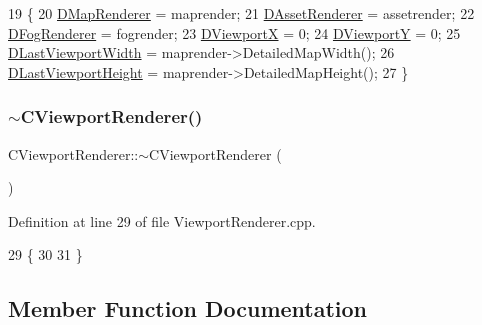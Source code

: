 \begin{DoxyCode}
19                                                                                                            
                                                            \{
20     \hyperlink{classCViewportRenderer_ac6bc7771bd6dcd35107d25bebb0c0a4c}{DMapRenderer} = maprender;
21     \hyperlink{classCViewportRenderer_a3daa075c87bbdde4d1ada41f0b98f4a8}{DAssetRenderer} = assetrender;
22     \hyperlink{classCViewportRenderer_a2fa9d183d00bdba4a2fea6d946992608}{DFogRenderer} = fogrender;
23     \hyperlink{classCViewportRenderer_aea9e05347f71a8e6b83439aab653be18}{DViewportX} = 0;
24     \hyperlink{classCViewportRenderer_ae13dd437a3da3d2bab16bc7ba61cb78f}{DViewportY} = 0;
25     \hyperlink{classCViewportRenderer_aaa21acd1b43badc3c1a3b0bf9b0f86f9}{DLastViewportWidth} = maprender->DetailedMapWidth();
26     \hyperlink{classCViewportRenderer_aaca5c330615fc2aacc57dede8e7c18b0}{DLastViewportHeight} = maprender->DetailedMapHeight();
27 \}
\end{DoxyCode}
\hypertarget{classCViewportRenderer_a88d046fb19e26d8d5f331e34aa86d598}{}\label{classCViewportRenderer_a88d046fb19e26d8d5f331e34aa86d598} 
\subsubsection{\texorpdfstring{$\sim$\+C\+Viewport\+Renderer()}{~CViewportRenderer()}}
{\footnotesize\ttfamily C\+Viewport\+Renderer\+::$\sim$\+C\+Viewport\+Renderer (\begin{DoxyParamCaption}{ }\end{DoxyParamCaption})}



Definition at line 29 of file Viewport\+Renderer.\+cpp.


\begin{DoxyCode}
29                                      \{
30 
31 \}
\end{DoxyCode}


\subsection{Member Function Documentation}
\hypertarget{classCViewportRenderer_a12842df851be0f115a735cec994d863e}{}\label{classCViewportRenderer_a12842df851be0f115a735cec994d863e} 

